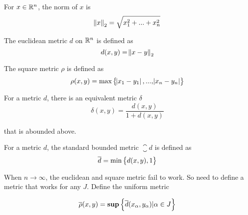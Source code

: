 \begin{definition}
    For $x \in \mathbb{R}^n$, the norm of $x$ is 
    \begin{equation}
        \norm{x}_2 = \sqrt{x_1^2 + ... + x_n^2}
    \end{equation}
\end{definition}

\begin{definition}
    The euclidean metric \emph{$d$} on $\mathbb{R}^n$ is defined as
    \begin{equation}
        d(x,y) = \norm{x - y}_2
    \end{equation}
\end{definition}

\begin{definition}
    The square metric \emph{$\rho$} is defined as
    \begin{equation}
        \rho (x,y) = \text{max}\set{\abs{x_1 - y_1}, ... , \abs{x_n - y_n} }
    \end{equation}
\end{definition}

\begin{theorem}
    For a metric $d$, there is an equivalent metric $\delta$
    \begin{equation}
        \delta (x,y) = \frac{d(x,y)}{1+d(x,y)}
    \end{equation}    
    
    that is abounded above.
\end{theorem}


\begin{definition}
    For a metric $d$, the standard bounded metric \emph{$\closure{d}$} is defined as
    \begin{equation}
        \overline{d} = \min \set{d(x,y), 1}
    \end{equation}
\end{definition}


\begin{definition}
    When $n \rightarrow \infty$, the euclidean and square metric fail to work. So need to define a metric that works for any $J$. Define the uniform metric 
    
    \begin{equation}
        \overline{\rho}(x,y) = \mathbf{sup} \set{ \overline{d}(x_{\alpha}, y_{\alpha}) | \alpha \in J}
    \end{equation}
\end{definition}


